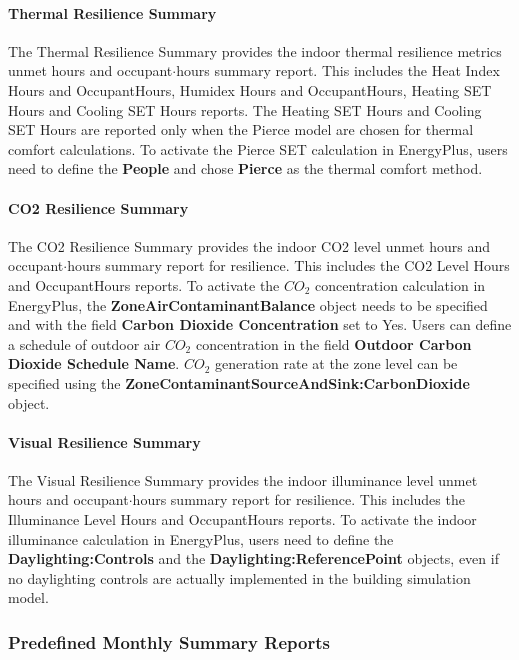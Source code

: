 \paragraph{Thermal Resilience Summary}\label{ThermalResilienceSummary}

The Thermal Resilience Summary provides the indoor thermal resilience metrics unmet hours and occupant$·$hours summary report. This includes the Heat Index Hours and OccupantHours, Humidex Hours and OccupantHours, Heating SET Hours and Cooling SET Hours reports. The Heating SET Hours and Cooling SET Hours are reported only when the Pierce model are chosen for thermal comfort calculations. To activate the Pierce SET calculation in EnergyPlus, users need to define the \textbf{People} and chose \textbf{Pierce} as the thermal comfort method.

\paragraph{CO2 Resilience Summary}\label{CO2ResilienceSummary}

The CO2 Resilience Summary provides the indoor CO2 level unmet hours and occupant$·$hours summary report for resilience. This includes the CO2 Level Hours and OccupantHours reports. To activate the $CO_2$ concentration calculation in EnergyPlus, the \textbf{ZoneAirContaminantBalance} object needs to be specified and with the field \textbf{Carbon Dioxide Concentration} set to Yes. Users can define a schedule of outdoor air $CO_2$ concentration in the field \textbf{Outdoor Carbon Dioxide Schedule Name}. $CO_2$ generation rate at the zone level can be specified using the \textbf{ZoneContaminantSourceAndSink:CarbonDioxide} object.

\paragraph{Visual Resilience Summary}\label{VisualResilienceSummary}

The Visual Resilience Summary provides the indoor illuminance level unmet hours and occupant$·$hours summary report for resilience. This includes the Illuminance Level Hours and OccupantHours reports. To activate the indoor illuminance calculation in EnergyPlus, users need to define the \textbf{Daylighting:Controls} and the \textbf{Daylighting:ReferencePoint} objects, even if no daylighting controls are actually implemented in the building simulation model.

\subsubsection{Predefined Monthly Summary Reports}\label{predefined-monthly-summary-reports}

